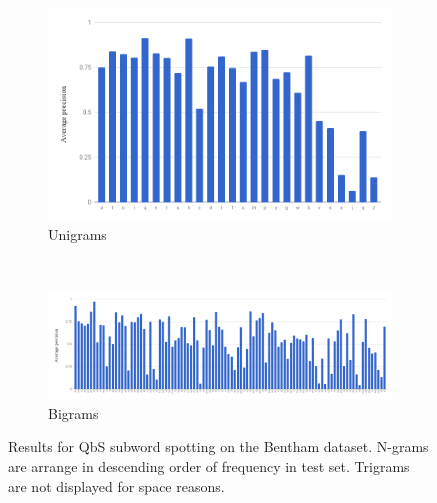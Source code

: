 \documentclass[ms,electronic,twosidetoc,letterpaper,chaptercenter,parttop,lol,lof,lot]{byumsphd}
\begin{document}
\begin{figure}
\centering
\begin{subfigure}{.99\textwidth}
  \centering
  \includegraphics[width=.75\linewidth]{benthamUniSpot}
  \caption{Unigrams}
  \label{fig:benthamUniSpot}
\end{subfigure}
\\
\begin{subfigure}{.99\textwidth}
  \centering
  \includegraphics[width=.99\linewidth]{benthamBiSpot}
  \caption{Bigrams}
  \label{fig:benthamBiSpot}
\end{subfigure}
\caption{Results for QbS subword spotting on the Bentham dataset. N-grams are arrange in descending order of frequency in test set. Trigrams are not displayed for space reasons.}
\label{fig:benthamsub}
\end{figure}
\end{document}
